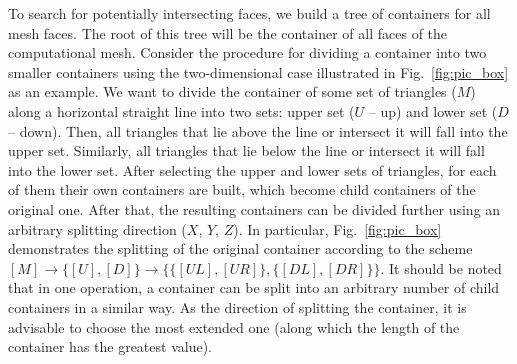 \documentclass[
11pt,%
tightenlines,%
twoside,%
onecolumn,%
nofloats,%
nobibnotes,%
nofootinbib,%
superscriptaddress,%
noshowpacs,%
centertags]%
{revtex4-2}
\begin{document}
To search for potentially intersecting faces, we build a tree of
containers  for all mesh faces.
The root of this tree will be the container of all faces of the
computational  mesh.
Consider the procedure for dividing a container into two smaller
containers  using the two-dimensional case illustrated in
Fig.~\ref{fig:pic_box} as an example.
We want to divide the container of some set of triangles ($M$) along
a  horizontal straight line into two sets: upper set ($U$ -- up) and
lower set ($D$ -- down).
Then, all triangles that lie above the line or intersect it will
fall into the upper set.
Similarly, all triangles that lie below the line or intersect it will fall into the lower set.
After selecting the upper and lower sets of triangles, for each of them their own containers are built, which become child containers of the original one.
After that, the resulting containers can be divided further using an arbitrary splitting direction ($X$, $Y$, $Z$).
In particular, Fig.~\ref{fig:pic_box} demonstrates the splitting of the original container according to the scheme $[M] \rightarrow \{[U], [D]\} \rightarrow \{\{[UL], [UR]\}, \{[DL], [DR]\}\}$.
It should be noted that in one operation, a container can be split into an arbitrary number of child containers in a similar way.
As the direction of splitting the container, it is advisable to choose the most extended one (along which the length of the container has the greatest value).
\end{document}
